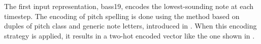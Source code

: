 
The first input representation, \gls{bass19}, encodes the
lowest-sounding note at each timestep. The encoding of pitch
spelling is done using the method based on duples of pitch
class and generic note letters, introduced in
. When this encoding
strategy is applied, it results in a two-hot encoded vector
like the one shown in .

